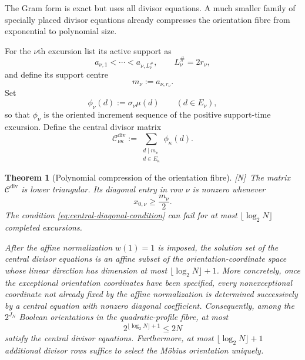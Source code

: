 \documentclass[11pt]{amsart}
\numberwithin{equation}{section}
\theoremstyle{plain}
\newtheorem{theorem}{Theorem}[section]
\theoremstyle{definition}
\theoremstyle{remark}
\newcommand{\tagN}{\textup{[N]}}
\begin{document}
The Gram form is exact but uses all divisor equations.  A much smaller family of specially placed divisor equations already compresses the orientation fibre from exponential to polynomial size.

For the $\nu$th excursion list its active support as
\[
a_{\nu,1}<\cdots<a_{\nu,L_\nu^\#},
\qquad L_\nu^\#=2r_\nu,
\]
and define its support centre
\[
m_\nu:=a_{\nu,r_\nu}.
\]
Set
\[
\phi_\nu(d):=\sigma_\nu\mu(d)
\qquad(d\in E_\nu),
\]
so that $\phi_\nu$ is the oriented increment sequence of the positive support-time excursion.  Define the central divisor matrix
\begin{equation}
\mathscr C^{\mathrm{div}}_{\nu\kappa}
:=
\sum_{\substack{d\mid m_\nu\\ d\in E_\kappa}}
\phi_\kappa(d).
\label{eq:central-divisor-matrix-new}
\end{equation}

\begin{theorem}[Polynomial compression of the orientation fibre]
\label{thm:polynomial-orientation-compression}
\tagN\ The matrix $\mathscr C^{\mathrm{div}}$ is lower triangular.  Its
diagonal entry in row $\nu$ is nonzero whenever
\begin{equation}
x_{0,\nu}\ge \frac{m_\nu}{2}.
\label{eq:central-diagonal-condition}
\end{equation}
The condition \eqref{eq:central-diagonal-condition} can fail for at most
$\lfloor\log_2N\rfloor$ completed excursions.

After the affine normalization $w(1)=1$ is imposed, the solution set of the
central divisor equations is an affine subset of the orientation-coordinate
space whose linear direction has dimension at most
$\lfloor\log_2N\rfloor+1$.  More concretely, once the exceptional orientation
coordinates have been specified, every nonexceptional coordinate not already
fixed by the affine normalization is determined successively by a central
equation with nonzero diagonal coefficient.  Consequently, among the
$2^{J_N}$ Boolean orientations in the quadratic-profile fibre, at most
\begin{equation}
2^{\lfloor\log_2N\rfloor+1}\le2N
\label{eq:polynomial-survivors}
\end{equation}
satisfy the central divisor equations.  Furthermore, at most
$\lfloor\log_2N\rfloor+1$ additional divisor rows suffice to select the
M\"obius orientation uniquely.
\end{theorem}
\end{document}
